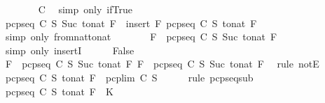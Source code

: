 \begin{isabellebody}
\ \ \ \ \ \ \isamarkupfalse%
\ C\ \isamarkupfalse%
\ {\isacharparenleft}simp\ only{\isacharcolon}\ if{\isacharunderscore}True{\isacharparenright}\isanewline
\ \ \ \ \isamarkupfalse%
\ \isamarkupfalse%
\ {\isachardoublequoteopen}pcp{\isacharunderscore}seq\ C\ S\ {\isacharparenleft}Suc\ {\isacharparenleft}to{\isacharunderscore}nat\ F{\isacharparenright}{\isacharparenright}\ {\isacharequal}\ insert\ F\ {\isacharparenleft}pcp{\isacharunderscore}seq\ C\ S\ {\isacharparenleft}to{\isacharunderscore}nat\ F{\isacharparenright}{\isacharparenright}{\isachardoublequoteclose}\isanewline
\ \ \ \ \ \ \isamarkupfalse%
\ {\isacharparenleft}simp\ only{\isacharcolon}\ from{\isacharunderscore}nat{\isacharunderscore}to{\isacharunderscore}nat{\isacharparenright}\isanewline
\ \ \ \ \isamarkupfalse%
\ \isamarkupfalse%
\ {\isachardoublequoteopen}F\ {\isasymin}\ pcp{\isacharunderscore}seq\ C\ S\ {\isacharparenleft}Suc\ {\isacharparenleft}to{\isacharunderscore}nat\ F{\isacharparenright}{\isacharparenright}{\isachardoublequoteclose}\isanewline
\ \ \ \ \ \ \isamarkupfalse%
\ {\isacharparenleft}simp\ only{\isacharcolon}\ insertI{}{\isacharparenright}\isanewline
\ \ \ \ \isamarkupfalse%
\ {\isachardoublequoteopen}False{\isachardoublequoteclose}\isanewline
\ \ \ \ \ \ \isamarkupfalse%
\ {\isacartoucheopen}F\ {\isasymnotin}\ pcp{\isacharunderscore}seq\ C\ S\ {\isacharparenleft}Suc\ {\isacharparenleft}to{\isacharunderscore}nat\ F{\isacharparenright}{\isacharparenright}{\isacartoucheclose}\ {\isacartoucheopen}F\ {\isasymin}\ pcp{\isacharunderscore}seq\ C\ S\ {\isacharparenleft}Suc\ {\isacharparenleft}to{\isacharunderscore}nat\ F{\isacharparenright}{\isacharparenright}{\isacartoucheclose}\ \isamarkupfalse%
\ {\isacharparenleft}rule\ notE{\isacharparenright}\isanewline
\ \ \isamarkupfalse%
\isanewline
\ \ \isamarkupfalse%
\ {\isachardoublequoteopen}pcp{\isacharunderscore}seq\ C\ S\ {\isacharparenleft}to{\isacharunderscore}nat\ F{\isacharparenright}\ {\isasymsubseteq}\ pcp{\isacharunderscore}lim\ C\ S{\isachardoublequoteclose}\isanewline
\ \ \ \ \isamarkupfalse%
\ {\isacharparenleft}rule\ pcp{\isacharunderscore}seq{\isacharunderscore}sub{\isacharparenright}\isanewline
\ \ \isamarkupfalse%
\ \isamarkupfalse%
\ {\isachardoublequoteopen}pcp{\isacharunderscore}seq\ C\ S\ {\isacharparenleft}to{\isacharunderscore}nat\ F{\isacharparenright}\ {\isasymsubseteq}\ K{\isachardoublequoteclose}\isanewline

\end{isabellebody}
